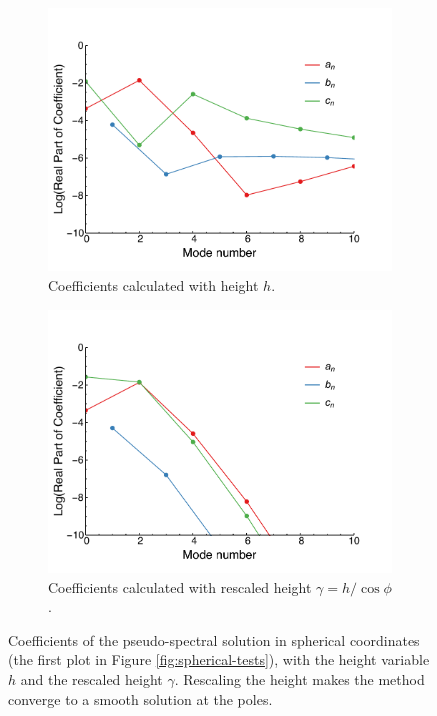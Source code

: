 \begin{figure}
    \centering
  \begin{subfigure}[b]{0.4\textwidth}
    \includegraphics[width=\textwidth]{figures/appendices/sphere-accuracy-noscale.pdf}
    \caption{Coefficients calculated with height $h$.}
  \end{subfigure}
  \begin{subfigure}[b]{0.4\textwidth}
    \includegraphics[width=\textwidth]{figures/appendices/sphere-accuracy-rescale.pdf}
    \caption{Coefficients calculated with rescaled height $\gamma = h / \cos\phi$.}
  \end{subfigure}
\caption{Coefficients of the pseudo-spectral solution in spherical coordinates (the first plot in Figure \ref{fig:spherical-tests}), with the height variable $h$ and the rescaled height $\gamma$. Rescaling the height makes the method converge to a smooth solution at the poles.}\label{fig:accuracy-spherical}
\end{figure}
